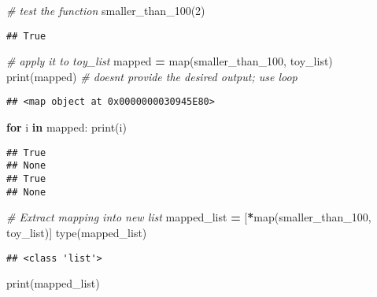 \documentclass[
]{book}
\newenvironment{Shaded}{\begin{snugshade}}{\end{snugshade}}
\newcommand{\BuiltInTok}[1]{#1}
\newcommand{\CommentTok}[1]{\textcolor[rgb]{0.56,0.35,0.01}{\textit{#1}}}
\newcommand{\ControlFlowTok}[1]{\textcolor[rgb]{0.13,0.29,0.53}{\textbf{#1}}}
\newcommand{\DecValTok}[1]{\textcolor[rgb]{0.00,0.00,0.81}{#1}}
\newcommand{\KeywordTok}[1]{\textcolor[rgb]{0.13,0.29,0.53}{\textbf{#1}}}
\newcommand{\NormalTok}[1]{#1}
\newcommand{\OperatorTok}[1]{\textcolor[rgb]{0.81,0.36,0.00}{\textbf{#1}}}
\begin{document}
\begin{Shaded}
\begin{Highlighting}[]
\CommentTok{\# test the function}
\NormalTok{smaller\_than\_100(}\DecValTok{2}\NormalTok{)}
\end{Highlighting}
\end{Shaded}

\begin{verbatim}
## True
\end{verbatim}

\begin{Shaded}
\begin{Highlighting}[]
\CommentTok{\# apply it to toy\_list}
\NormalTok{mapped }\OperatorTok{=} \BuiltInTok{map}\NormalTok{(smaller\_than\_100, toy\_list)}
\BuiltInTok{print}\NormalTok{(mapped) }\CommentTok{\# doesn\textquotesingle{}t provide the desired output; use loop}
\end{Highlighting}
\end{Shaded}

\begin{verbatim}
## <map object at 0x0000000030945E80>
\end{verbatim}

\begin{Shaded}
\begin{Highlighting}[]
\ControlFlowTok{for}\NormalTok{ i }\KeywordTok{in}\NormalTok{ mapped:}
    \BuiltInTok{print}\NormalTok{(i)}
\end{Highlighting}
\end{Shaded}

\begin{verbatim}
## True
## None
## True
## None
\end{verbatim}

\begin{Shaded}
\begin{Highlighting}[]
\CommentTok{\# Extract mapping into new list}
\NormalTok{mapped\_list }\OperatorTok{=}\NormalTok{ [}\OperatorTok{*}\BuiltInTok{map}\NormalTok{(smaller\_than\_100, toy\_list)]}
\BuiltInTok{type}\NormalTok{(mapped\_list)}
\end{Highlighting}
\end{Shaded}

\begin{verbatim}
## <class 'list'>
\end{verbatim}

\begin{Shaded}
\begin{Highlighting}[]
\BuiltInTok{print}\NormalTok{(mapped\_list)}
\end{Highlighting}
\end{Shaded}
\end{document}
